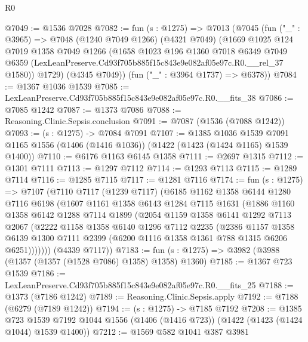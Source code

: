 \begin{lexlean}{R0}
\begin{coremodule}
@7049 := @1536 @7028
@7082 := fun (s : @1275) =>
  @7013
    (@7045
      (fun ("_" : @3965) =>
      @7048
        (@1240 @7049 @1266)
        (@4321 @7049)
        (@1669
          @1025
          @124
          @7019
          @1358
          @7049
          @1266
          (@1658
            @1023
            @196
            @1360
            @7018
            @6349
            @7049
            @6359
            (LexLeanPreserve.Cd93f705b885f15c843e9e082af05e97c.R0.__rel_37 @1580))
          @1729)
        (@4345 @7049))
      (fun ("_" : @3964 @1737) => @6378))
@7084 := @1367 @1036 @1539
@7085 := LexLeanPreserve.Cd93f705b885f15c843e9e082af05e97c.R0.__fits_38
@7086 := @7085 @1242
@7087 := @1373 @7086
@7088 := Reasoning.Clinic.Sepsis.conclusion
@7091 := @7087 (@1536 (@7088 @1242))
@7093 := (s : @1275) -> @7084 @7091
@7107 := @1385
    @1036
    @1539
    @7091
    @1165
    @1556
    (@1406 (@1416 @1036))
    (@1422 (@1423 (@1424 @1165) @1539 @1400))
@7110 := @6176 @1163 @6145 @1358
@7111 := @2697 @1315
@7112 := @1301 @7111
@7113 := @1297 @7112
@7114 := @1293 @7113
@7115 := @1289 @7114
@7116 := @1285 @7115
@7117 := @1281 @7116
@7174 := fun (s : @1275) =>
  @7107
    (@7110
      @7117
      (@1239 @7117)
      (@6185
        @1162
        @1358
        @6144
        @1280
        @7116
        @6198
        (@1607
          @1161
          @1358
          @6143
          @1284
          @7115
          @1631
          (@1886
            @1160
            @1358
            @6142
            @1288
            @7114
            @1899
            (@2054
              @1159
              @1358
              @6141
              @1292
              @7113
              @2067
              (@2222
                @1158
                @1358
                @6140
                @1296
                @7112
                @2235
                (@2386
                  @1157
                  @1358
                  @6139
                  @1300
                  @7111
                  @2399
                  (@6200 @1116 @1358 @1361 @788 @1315 @6206 @6251)))))))
      (@4339 @7117))
@7183 := fun (s : @1275) => @3982 (@3988 (@1357 (@1357 (@1528 @7086) @1358) @1358) @1360)
@7185 := @1367 @723 @1539
@7186 := LexLeanPreserve.Cd93f705b885f15c843e9e082af05e97c.R0.__fits_25
@7188 := @1373 (@7186 @1242)
@7189 := Reasoning.Clinic.Sepsis.apply
@7192 := @7188 (@6279 (@7189 @1242))
@7194 := (s : @1275) -> @7185 @7192
@7208 := @1385
    @723
    @1539
    @7192
    @1044
    @1556
    (@1406 (@1416 @723))
    (@1422 (@1423 (@1424 @1044) @1539 @1400))
@7212 := @1569 @582 @1041 @387 @3981

\end{coremodule}
\end{lexlean}
